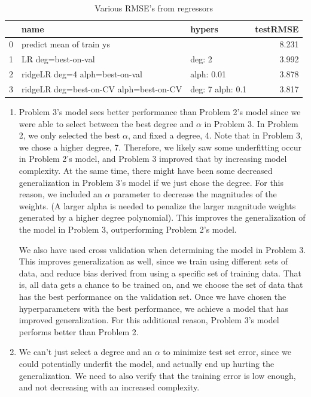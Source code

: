 \documentclass[12pt]{article}
\begin{document}
\begin{table}[h]
    \centering
    \begin{tabular}{lllr}
        \toprule
         & name & hypers & testRMSE \\
        \midrule
        0 & predict mean of train ys &  & 8.231 \\
        1 & LR deg=best-on-val & deg: 2 & 3.992 \\
        2 & ridgeLR deg=4 alph=best-on-val & alph: 0.01 & 3.878 \\
        3 & ridgeLR deg=best-on-CV alph=best-on-CV & deg: 7 alph: 0.1 & 3.817 \\
        \bottomrule
        \end{tabular}
    \caption{Various RMSE's from regressors}

    \begin{enumerate}[label=(\roman*)]
        \item Problem 3's model sees better performance than Problem 2's model
        since we were able to select between the best degree and $\alpha$ in
        Problem 3. In Problem 2, we only selected the best $\alpha$, and fixed
        a degree, 4. Note that in Problem 3, we chose a higher degree, 7.
        Therefore, we likely saw some underfitting occur in Problem 2's model,
        and Problem 3 improved that by increasing model complexity. At the same
        time, there might have been some decreased generalization in Problem
        3's model if we just chose the degree. For
        this reason, we included an $\alpha$ parameter to decrease the
        magnitudes of the weights. (A larger alpha is needed to penalize the
        larger magnitude weights generated by a higher degree polynomial). This improves the generalization of the
        model in Problem 3, outperforming Problem 2's model.



        We also have used cross validation when determining the model in
        Problem 3. This improves generalization as well, since we train using
        different sets of data, and reduce bias derived from using a specific
        set of training data. That is, all data gets a chance to be trained on,
        and we choose the set of data that has the best performance on the
        validation set. Once we have chosen the hyperparameters with the best
        performance, we achieve a model that has improved generalization. For this additional reason, Problem 3's model
        performs better than Problem 2.

        \item We can't just select a degree and an $\alpha$ to minimize test
        set error, since we could potentially underfit the model, and actually
        end up hurting the generalization. We need to also verify that the
        training error is low enough, and not decreasing with an increased complexity.
        
    \end{enumerate}
    
\end{table}
\end{document}
